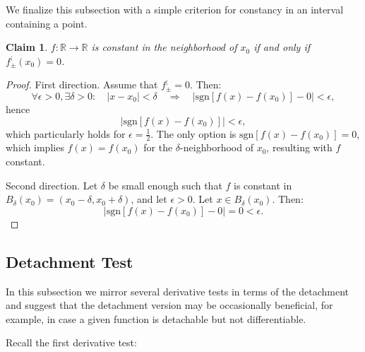 \documentclass[11pt]{book}
\newtheorem{clm}[thm]{Claim}
\begin{document}
We finalize this subsection with a simple criterion for constancy in an interval containing a point.

\begin{clm}\label{constancy_condition}$f:\mathbb{R}\rightarrow\mathbb{R}$ is constant in the neighborhood
of $x_{0}$ if and only if $f_{\pm}^{;}\left(x_{0}\right)=0$.
\end{clm}

\begin{proof}First direction. Assume that $f_{\pm}^{;}=0$. Then:
\[
\forall\epsilon>0,\exists\delta>0:\quad\left|x-x_{0}\right|<\delta\quad\Longrightarrow\quad\left|\text{sgn}\left[f\left(x\right)-f\left(x_{0}\right)\right]-0\right|<\epsilon,
\]
hence $$\left|\text{sgn}\left[f\left(x\right)-f\left(x_{0}\right)\right]\right|<\epsilon,$$
which particularly holds for $\epsilon=\frac{1}{2}$. The only option
is $\text{sgn}\left[f\left(x\right)-f\left(x_{0}\right)\right]=0$, which
implies $f\left(x\right)=f\left(x_{0}\right)$ for the $\delta$-neighborhood
of $x_{0}$, resulting with $f$ constant.

Second direction. Let $\delta$ be small enough such that $f$ is
constant in $B_{\delta}\left(x_{0}\right)=\left(x_{0}-\delta,x_{0}+\delta\right)$,
and let $\epsilon>0$. Let $x\in B_{\delta}\left(x_{0}\right)$. Then:
\[
\left|\text{sgn}\left[f\left(x\right)-f\left(x_{0}\right)\right]-0\right|=0<\epsilon.
\]
\end{proof}

\subsection{Detachment Test}

In this subsection we mirror several derivative tests in terms of the detachment and suggest that the detachment version may be occasionally beneficial, for example, in case a given function is detachable but not differentiable.

Recall the first derivative test:
\end{document}
